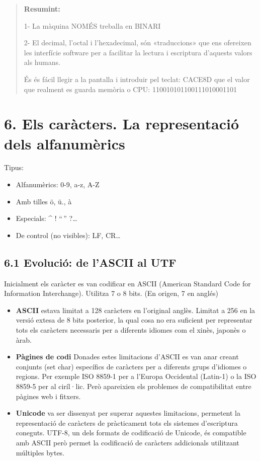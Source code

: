 \documentclass[
  12 pt,
  a4paper,
]{article}
\begin{document}
\begin{quote}
\textbf{Resumint:}

1- La màquina NOMÉS treballa en BINARI

2- El decimal, l'octal i l'hexadecimal, són «traduccions» que ens
ofereixen les interfície software per a facilitar la lectura i
escriptura d'aquests valors als humans.

És és fácil llegir a la pantalla i introduir pel teclat: CACE8D que el
valor que realment es guarda memòria o CPU: 110010101100111010001101
\end{quote}

\section{6. Els caràcters. La representació dels
alfanumèrics}\label{els-caruxe0cters.-la-representaciuxf3-dels-alfanumuxe8rics}

Tipus:

\begin{itemize}
\item
  Alfanumèrics: 0-9, a-z, A-Z
\item
  Amb tilles ö, ü., à
\item
  Especials: \^{} ! ``\,'' ?\ldots{}
\item
  De control (no visibles): LF, CR\ldots{}
\end{itemize}

\subsection{6.1 Evolució: de l'ASCII al
UTF}\label{evoluciuxf3-de-lascii-al-utf}

Inicialment els caràcter es van codificar en ASCII (American Standard
Code for Information Interchange). Utilitza 7 o 8 bits. (En origen, 7 en
anglés)

\begin{itemize}
\item
  \textbf{ASCII} estava limitat a 128 caràcters en l'original anglès.
  Limitat a 256 en la versió extesa de 8 bits posterior, la qual cosa no
  era suficient per representar tots els caràcters necessaris per a
  diferents idiomes com el xinès, japonès o àrab.
\item
  \textbf{Pàgines de codi} Donades estes limitacions d'ASCII es van anar
  creant conjunts (set char) específics de caràcters per a diferents
  grups d'idiomes o regions. Per exemple ISO 8859-1 per a l'Europa
  Occidental (Latin-1) o la ISO 8859-5 per al ciríl·lic. Però apareixien
  els problemes de compatibilitat entre pàgines web i fitxers.
\item
  \textbf{Unicode} va ser dissenyat per superar aquestes limitacions,
  permetent la representació de caràcters de pràcticament tots els
  sistemes d'escriptura coneguts. UTF-8, un dels formats de codificació
  de Unicode, és compatible amb ASCII però permet la codificació de
  caràcters addicionals utilitzant múltiples bytes.
\end{itemize}
\end{document}
